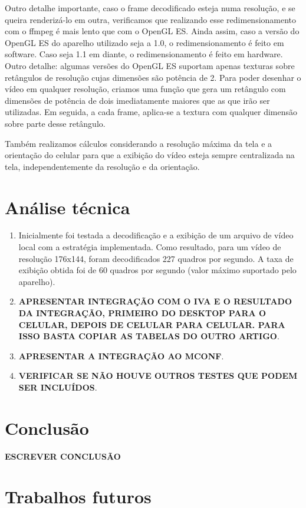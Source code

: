 \documentclass{acm_proc_article-sp}
\newcommand{\todo}[1]{\textcolor[rgb]{1.00,0.00,0.00}{\bf \uppercase{#1}}}
\begin{document}
Outro detalhe importante, caso o frame decodificado esteja numa resolução, e se queira renderizá-lo em outra, verificamos que realizando esse redimensionamento com o ffmpeg é mais lento que com o OpenGL ES. Ainda assim, caso a versão do OpenGL ES do aparelho utilizado seja a 1.0, o redimensionamento é feito em software. Caso seja 1.1 em diante, o redimensionamento é feito em hardware. Outro detalhe: algumas versões do OpenGL ES suportam apenas texturas sobre retângulos de resolução cujas dimensões são potência de 2. Para poder desenhar o vídeo em qualquer resolução, criamos uma função que gera um retângulo com dimensões de potência de dois imediatamente maiores que as que irão ser utilizadas. Em seguida, a cada frame, aplica-se a textura com qualquer dimensão sobre parte desse retângulo.

Também realizamos cálculos considerando a resolução máxima da tela e a orientação do celular para que a exibição do vídeo esteja sempre centralizada na tela, independentemente da resolução e da orientação.

\section{Análise técnica}

\begin{enumerate}
 \item Inicialmente foi testada a decodificação e a exibição de um arquivo de vídeo local com a estratégia implementada. Como resultado, para um vídeo de resolução 176x144, foram decodificados 227 quadros por segundo. A taxa de exibição obtida foi de 60 quadros por segundo (valor máximo suportado pelo aparelho).
 \item \todo{Apresentar integração com o iva e o resultado da integração, primeiro do desktop para o celular, depois de celular para celular. Para isso basta copiar as tabelas do outro artigo}.
 \item \todo{Apresentar a integração ao mconf}.
 \item \todo{Verificar se não houve outros testes que podem ser incluídos}.
\end{enumerate}

\section{Conclusão}

\todo{escrever conclusão}

\section{Trabalhos futuros}
\end{document}
